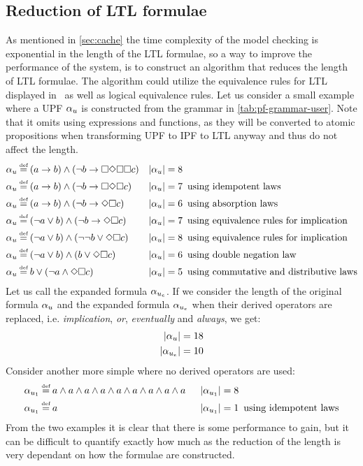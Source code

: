 \subsection{Reduction of LTL formulae}\label{sec:min-ltl}
As mentioned in \autoref{sec:cache} the time complexity of the model checking is exponential in the length of the LTL formulae, so a way to improve the performance of the system, is to construct an algorithm that reduces the length of LTL formulae. The algorithm could utilize the equivalence rules for LTL displayed in~\cite[Fig.~5.7]{baier2008principles} as well as logical equivalence rules. Let us consider a small example where a UPF $\alpha_u$ is constructed from the grammar in \autoref{tab:pf-grammar-user}. Note that it omits using expressions and functions, as they will be converted to atomic propositions when transforming UPF to IPF to LTL anyway and thus do not affect the length.
\begin{align*}
    \pf_u &\eqdef (a \imply b) \land (\lnot b \imply \G\F\G\G c)     &|\upf| = 8 & \\
    \pf_u &\eqdef (a \imply b) \land (\lnot b \imply \G\F\G c)       &|\upf| = 7 &\enskip \text{using idempotent laws} \\
    \pf_u &\eqdef (a \imply b) \land (\lnot b \imply \F\G c)         &|\upf| = 6 &\enskip \text{using absorption laws} \\
    \pf_u &\eqdef (\lnot a \lor b) \land (\lnot b \imply \F\G c)     &|\upf| = 7 &\enskip \text{using equivalence rules for implication} \\
    \pf_u &\eqdef (\lnot a \lor b) \land (\lnot \lnot b \lor \F\G c) &|\upf| = 8 &\enskip \text{using equivalence rules for implication} \\
    \pf_u &\eqdef (\lnot a \lor b) \land (b \lor \F\G c)             &|\upf| = 6 &\enskip \text{using double negation law} \\
    \pf_u &\eqdef b \lor (\lnot a \land \F\G c)                      &|\upf| = 5 &\enskip \text{using commutative and distributive laws}
\end{align*}
Let us call the expanded formula $\alpha_{u_e}$. If we consider the length of the original formula $\alpha_u$ and the expanded formula $\alpha_{u_e}$ when their derived operators are replaced, i.e. \emph{implication}, \emph{or}, \emph{eventually} and \emph{always}, we get:
\begin{align}
    |\alpha_u| = 18 \\
    |\alpha_{u_e}| = 10
\end{align}
Consider another more simple where no derived operators are used:
\begin{align*}
    \pf_{u_1} &\eqdef a \land a \land a \land a \land a \land a \land a \land a \land a \enskip &|\pf_{u_1}| = 8 & \\
    \pf_{u_1} &\eqdef a                                                                 \enskip &|\pf_{u_1}| = 1 &\enskip \text{using idempotent laws}
\end{align*}
From the two examples it is clear that there is some performance to gain, but it can be difficult to quantify exactly how much as the reduction of the length is very dependant on how the formulae are constructed.

